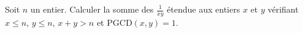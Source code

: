 Soit $n$ un entier. Calculer la somme des $\frac{1}{xy}$ étendue aux entiers $x$ et $y$ vérifiant $x \leq n$, $y \leq n$, $x + y > n$ et $\mathrm{PGCD}(x, y) = 1$.
